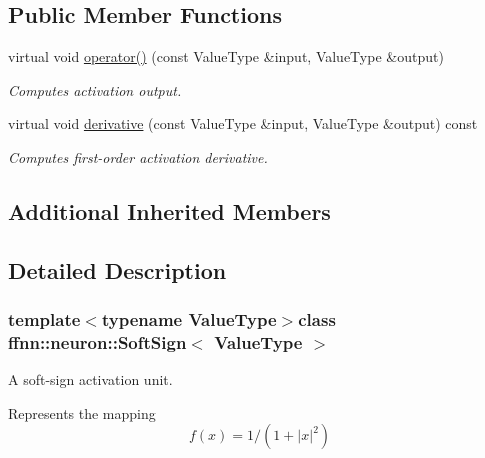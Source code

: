 \subsection*{Public Member Functions}
\begin{DoxyCompactItemize}
\item 
virtual void \hyperlink{classffnn_1_1neuron_1_1_soft_sign_a1d3ecb32d2eeea06b988ef4f779303e0}{operator()} (const Value\-Type \&input, Value\-Type \&output)
\begin{DoxyCompactList}\small\item\em Computes activation output. \end{DoxyCompactList}\item 
virtual void \hyperlink{classffnn_1_1neuron_1_1_soft_sign_a1284d2661377557e782547613e299736}{derivative} (const Value\-Type \&input, Value\-Type \&output) const 
\begin{DoxyCompactList}\small\item\em Computes first-\/order activation derivative. \end{DoxyCompactList}\end{DoxyCompactItemize}
\subsection*{Additional Inherited Members}


\subsection{Detailed Description}
\subsubsection*{template$<$typename Value\-Type$>$class ffnn\-::neuron\-::\-Soft\-Sign$<$ Value\-Type $>$}

A soft-\/sign activation unit. 

Represents the mapping \[ f(x) = 1 / (1 + |x|^{2}) \] 

